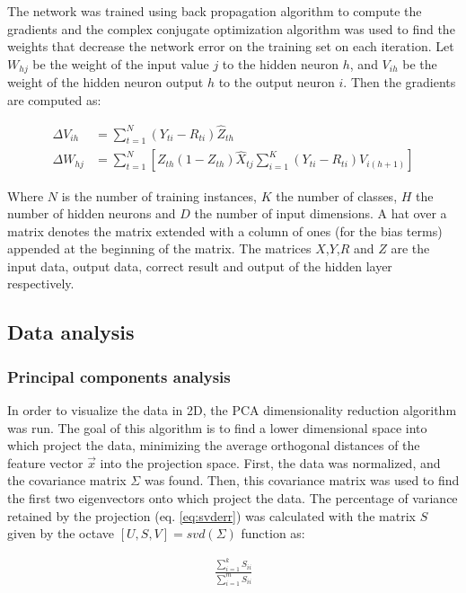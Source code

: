 \documentclass{IEEEtran}
\begin{document}
The network was trained using back propagation algorithm to compute the gradients and the complex conjugate
optimization algorithm was used to find the weights that decrease the network error on the training set on
each iteration. Let $W_{hj}$ be the weight of the input value $j$ to the hidden neuron $h$, and $V_{ih}$ be
the weight of the hidden neuron output $h$ to the output neuron $i$. Then the gradients are computed as:

\begin{align}
\Delta V_{ih} &= \sum_{t=1}^{N}{(Y_{ti} - R_{ti}) \hat{Z}_{th}} \label{eq:gradV} \\ 
\Delta W_{hj} &= \sum_{t=1}^{N}{ 
    \left[ Z_{th}(1 - Z_{th})\hat{X}_{tj} \sum_{i=1}^{K}{ (Y_{ti} - R_{ti})V_{i(h+1)} } \right]
}  \label{eq:gradW}
\end{align}

Where $N$ is the number of training instances, $K$ the number of classes, $H$ the number of hidden neurons 
and $D$ the number of input dimensions. A hat over a matrix denotes the matrix extended with a column of
ones (for the bias terms) appended at the beginning of the matrix. The matrices $X$,$Y$,$R$ and $Z$ are
the input data, output data, correct result and output of the hidden layer respectively.

\subsection{Data analysis}

\subsubsection{Principal components analysis}
In order to visualize the data in 2D, the PCA dimensionality reduction algorithm was run.
The goal of this algorithm is to find a lower dimensional space into which project the data, minimizing
the average orthogonal distances of the feature vector $\vec{x}$ into the projection space. First, the data
was normalized, and the covariance matrix $\Sigma$ was found. Then, this covariance matrix was used to find the
first two eigenvectors onto which project the data. The percentage of variance retained by the projection 
(eq. \ref{eq:svderr}) was calculated with the matrix $S$ given by the octave $[U,S,V] = svd(\Sigma)$ function as:

\begin{align}
\frac{\sum_{i=1}^{k}S_{ii}}{\sum_{i=1}^{m}S_{ii}} \label{eq:svderr}
\end{align}
\end{document}
